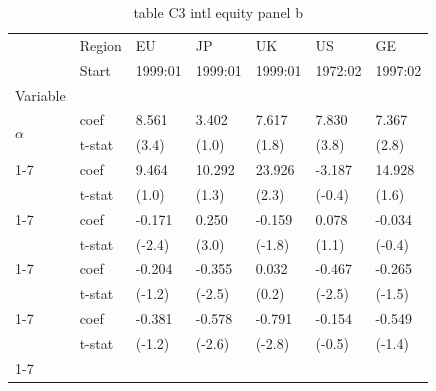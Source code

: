 \begin{table}[htbp]
  \centering
  \caption{table C3 intl equity panel b}
  \label{tab:table_C3_intl_equity_panel_b}
  \begin{tabular}{lllllll}
\toprule
 & Region & EU & JP & UK & US & GE \\
 & Start & 1999:01 & 1999:01 & 1999:01 & 1972:02 & 1997:02 \\
Variable &  &  &  &  &  &  \\
\midrule
\multirow[t]{2}{*}{$\alpha$} & coef & 8.561 & 3.402 & 7.617 & 7.830 & 7.367 \\
 & t-stat & (3.4) & (1.0) & (1.8) & (3.8) & (2.8) \\
\cline{1-7}
\multirow[t]{2}{*}{$I_B$} & coef & 9.464 & 10.292 & 23.926 & -3.187 & 14.928 \\
 & t-stat & (1.0) & (1.3) & (2.3) & (-0.4) & (1.6) \\
\cline{1-7}
\multirow[t]{2}{*}{$R^e_m$} & coef & -0.171 & 0.250 & -0.159 & 0.078 & -0.034 \\
 & t-stat & (-2.4) & (3.0) & (-1.8) & (1.1) & (-0.4) \\
\cline{1-7}
\multirow[t]{2}{*}{$I_B R^e_m$} & coef & -0.204 & -0.355 & 0.032 & -0.467 & -0.265 \\
 & t-stat & (-1.2) & (-2.5) & (0.2) & (-2.5) & (-1.5) \\
\cline{1-7}
\multirow[t]{2}{*}{$I_B I_U R^e_m$} & coef & -0.381 & -0.578 & -0.791 & -0.154 & -0.549 \\
 & t-stat & (-1.2) & (-2.6) & (-2.8) & (-0.5) & (-1.4) \\
\cline{1-7}
\bottomrule
\end{tabular}

\end{table}
